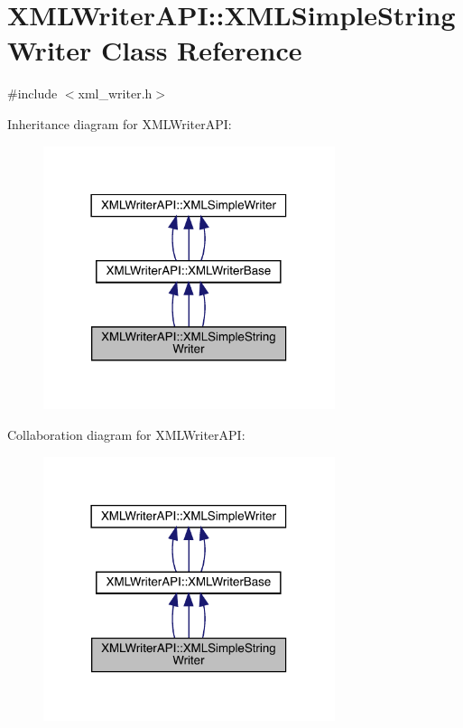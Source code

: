 \hypertarget{classXMLWriterAPI_1_1XMLSimpleStringWriter}{}\section{X\+M\+L\+Writer\+A\+PI\+:\+:X\+M\+L\+Simple\+String\+Writer Class Reference}
\label{classXMLWriterAPI_1_1XMLSimpleStringWriter}


{\ttfamily \#include $<$xml\+\_\+writer.\+h$>$}



Inheritance diagram for X\+M\+L\+Writer\+A\+PI\+:
\nopagebreak
\begin{figure}[H]
\begin{center}
\leavevmode
\includegraphics[width=242pt]{d9/d7e/classXMLWriterAPI_1_1XMLSimpleStringWriter__inherit__graph}
\end{center}
\end{figure}


Collaboration diagram for X\+M\+L\+Writer\+A\+PI\+:
\nopagebreak
\begin{figure}[H]
\begin{center}
\leavevmode
\includegraphics[width=242pt]{d6/d4b/classXMLWriterAPI_1_1XMLSimpleStringWriter__coll__graph}
\end{center}
\end{figure}
